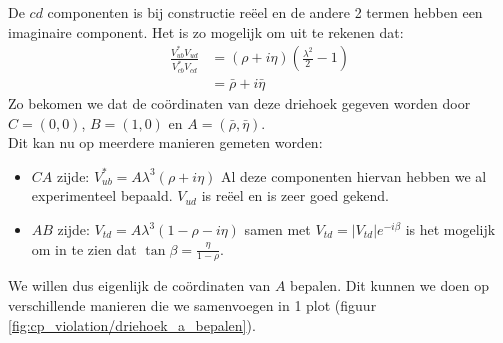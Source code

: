 \documentclass[../main.tex]{subfiles}
\begin{document}
De $cd$ componenten is bij constructie reëel en de andere 2 termen hebben een imaginaire component. Het is zo mogelijk om uit te rekenen dat:
\begin{equation}
    \begin{aligned}
        \label{eq:driehoeksvoorstelling_mat_vermenigvuldiging}
        \frac{V_{u b}^{*} V_{u d}}{V_{c b}^{*} V_{c d}} &=(\rho+i \eta)\left(\frac{\lambda^{2}}{2}-1\right) \\
                                                        &=\bar{\rho}+i \bar{\eta}
    \end{aligned}
\end{equation}
Zo bekomen we dat de coördinaten van deze driehoek gegeven worden door $C=(0,0)$, $B=(1,0)$ en $A=(\bar{\rho}, \bar{\eta})$.\\
Dit kan nu op meerdere manieren gemeten worden:
\begin{itemize}
    \item $CA$ zijde: $V_{u b}^{*}=A \lambda^{3}(\rho+i \eta)$ Al deze componenten hiervan hebben we al experimenteel bepaald. $V_{ud}$ is reëel en is zeer goed gekend.
    \item $AB$ zijde: $V_{t d}=A \lambda^{3}(1-\rho-i \eta)$ samen met $V_{t d}=\left|V_{t d}\right| e^{-i \beta}$ is het mogelijk om in te zien dat $\tan \beta=\frac{\eta}{1-\rho}$.
\end{itemize}
We willen dus eigenlijk de coördinaten van $A$ bepalen. Dit kunnen we doen op verschillende manieren die we samenvoegen in 1 plot (figuur \ref{fig:cp_violation/driehoek_a_bepalen}).
\end{document}
